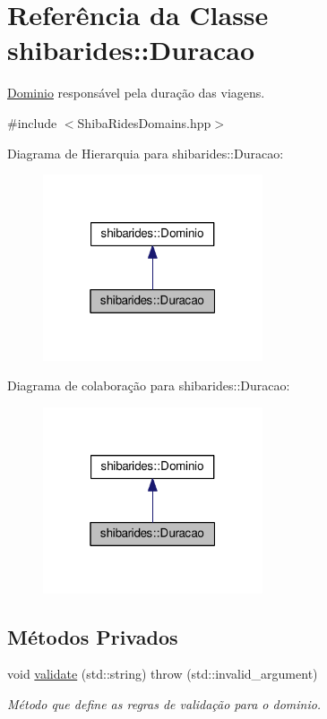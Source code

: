 \hypertarget{classshibarides_1_1Duracao}{}\section{Referência da Classe shibarides\+:\+:Duracao}
\label{classshibarides_1_1Duracao}


\hyperlink{classshibarides_1_1Dominio}{Dominio} responsável pela duração das viagens.  




{\ttfamily \#include $<$Shiba\+Rides\+Domains.\+hpp$>$}



Diagrama de Hierarquia para shibarides\+:\+:Duracao\+:\nopagebreak
\begin{figure}[H]
\begin{center}
\leavevmode
\includegraphics[width=184pt]{classshibarides_1_1Duracao__inherit__graph}
\end{center}
\end{figure}


Diagrama de colaboração para shibarides\+:\+:Duracao\+:\nopagebreak
\begin{figure}[H]
\begin{center}
\leavevmode
\includegraphics[width=184pt]{classshibarides_1_1Duracao__coll__graph}
\end{center}
\end{figure}
\subsection*{Métodos Privados}
\begin{DoxyCompactItemize}
\item 
void \hyperlink{classshibarides_1_1Duracao_aa64196edbfe284120c3d498e20212a99}{validate} (std\+::string)  throw (std\+::invalid\+\_\+argument)
\begin{DoxyCompactList}\small\item\em Método que define as regras de validação para o dominio. \end{DoxyCompactList}\end{DoxyCompactItemize}
